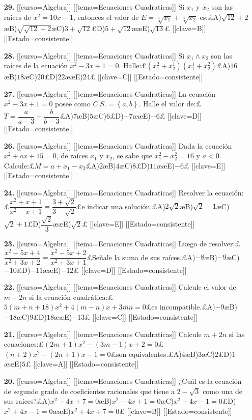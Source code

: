 \begin{enumerate}
\item[\textbf{29.}] [[curso=Algebra]] [[tema=Ecuaciones Cuadraticas]] Si $x_1$ y $x_2$ son las raíces de $x^2=10x-1$, entonces el valor de $E=\sqrt[4]{x_1}+\sqrt[4]{x_2}$ es:£A)$\sqrt{12}+2$æB)$\sqrt{\sqrt{12}+2}$æC)$3+\sqrt{12}$£D)$5+\sqrt{12}$ææE)$\sqrt{13}$£ [[clave=B]] [[Estado=consistente]]
\item[\textbf{28.}] [[curso=Algebra]] [[tema=Ecuaciones Cuadraticas]] Si $x_1\land x_2$ son las raíces de la ecuación $x^2-3x+1=0$. Halle:£$\left(x_1^2+x_2^1\right)\left(x_1^1+x_2^2\right)$£A)$16$æB)$18$æC)$20$£D)$22$ææE)$24$£ [[clave=C]] [[Estado=consistente]]
\item[\textbf{27.}] [[curso=Algebra]] [[tema=Ecuaciones Cuadraticas]] La ecuación $x^2-3x+1=0$ posee como $C.S.=\left\{a,b\right\}$. Halle el valor de:£$T=\dfrac{a}{a-3}+\dfrac{b}{b-3}$£A)$7$æB)$5$æC)$6$£D)$-7$ææE)$-6$£ [[clave=D]] [[Estado=consistente]]
\item[\textbf{26.}] [[curso=Algebra]] [[tema=Ecuaciones Cuadraticas]] Dada la ecuación $x^2+ax+15=0$, de raíces $x_1$ y $x_2$, se sabe que $x_1^2-x_2^2=16$ y $a<0$. Calcule:£$M=a+x_1-x_2$£A)$2$æB)$4$æC)$8$£D)$11$ææE)$-6$£ [[clave=E]] [[Estado=consistente]]
\item[\textbf{24.}] [[curso=Algebra]] [[tema=Ecuaciones Cuadraticas]] Resolver la ecuación:£$\dfrac{x^2+x+1}{x^2-x+1}=\dfrac{3+\sqrt{2}}{3-\sqrt{2}}$£e indicar una solución.£A)$2\sqrt{2}$æB)$\sqrt{2}-1$æC)$\sqrt{2}+1$£D)$\dfrac{\sqrt{2}}{3}$ææE)$\sqrt{2}$£ [[clave=E]] [[Estado=consistente]]
\item[\textbf{23.}] [[curso=Algebra]] [[tema=Ecuaciones Cuadraticas]] Luego de resolver:£$\dfrac{x^2-5x+4}{x^2+3x+2}=\dfrac{x^2-5x+2}{x^2+3x+1}$£Señale la suma de sus raíces.£A)$-8$æB)$-9$æC)$-10$£D)$-11$ææE)$-12$£ [[clave=D]] [[Estado=consistente]]
\item[\textbf{22.}] [[curso=Algebra]] [[tema=Ecuaciones Cuadraticas]] Calcule el valor de $m-2n$ si la ecuación cuadrática:£$5\left(m+n+18\right)x^2+4\left(m-n\right)x+3mn=0$£es incompatible.£A)$-9$æB)$-18$æC)$9$£D)$18$ææE)$-13$£ [[clave=C]] [[Estado=consistente]]
\item[\textbf{21.}] [[curso=Algebra]] [[tema=Ecuaciones Cuadraticas]] Calcule $m+2n$ si las ecuaciones:£$\left(2m+1\right)x^2-\left(3m-1\right)x+2=0$£$\left(n+2\right)x^2-\left(2n+1\right)x-1=0$£son equivalentes.£A)$4$æB)$3$æC)$2$£D)$1$ææE)$5$£ [[clave=A]] [[Estado=consistente]]
\item[\textbf{20.}] [[curso=Algebra]] [[tema=Ecuaciones Cuadraticas]] ¿Cuál es la ecuación de segundo grado de coeficientes racionales que tiene a $2-\sqrt{3}$ como una de sus raíces?£A)$x^2-4x+7=0$æB)$x^2-4x+1=0$æC)$x^2+4x-1=0$£D)$x^2+4x-1=0$ææE)$x^2+4x+7=0$£ [[clave=B]] [[Estado=consistente]]

\end{enumerate}
